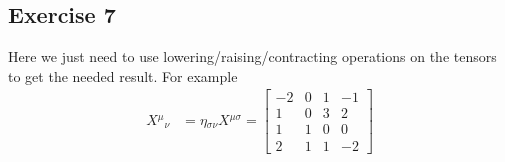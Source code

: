 \subsection{Exercise 7}
Here we just need to use lowering/raising/contracting operations on the tensors to get the needed result. For example
\begin{align}
    X{^\mu}{_\nu} &= \eta{_{\sigma\nu}} X{^{\mu\sigma}} = \begin{bmatrix}
        -2 & 0 & 1 & -1 \\
        1 & 0 & 3 & 2 \\
        1 & 1 & 0 & 0 \\
        2 & 1 & 1 & -2 
    \end{bmatrix}
\end{align}


